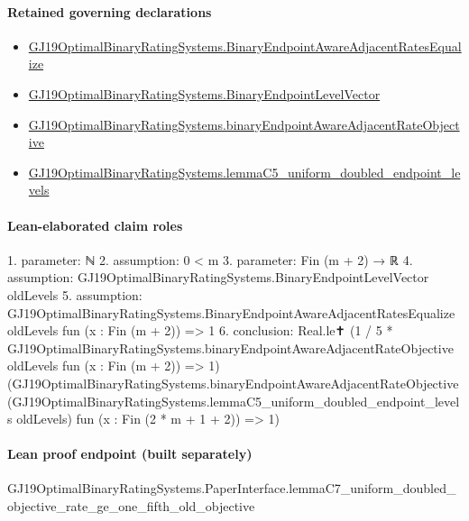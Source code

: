 \documentclass[10pt]{article}
\begin{document}
\paragraph{Retained governing declarations}
\begin{itemize}\raggedright
\item \hyperlink{governing-declaration-5a62c276eedad684}{GJ19\allowbreak{}Optimal\allowbreak{}Binary\allowbreak{}Rating\allowbreak{}Systems.\allowbreak{}Binary\allowbreak{}Endpoint\allowbreak{}Aware\allowbreak{}Adjacent\allowbreak{}Rates\allowbreak{}Equalize}
\item \hyperlink{governing-declaration-aa797f827cdcda67}{GJ19\allowbreak{}Optimal\allowbreak{}Binary\allowbreak{}Rating\allowbreak{}Systems.\allowbreak{}Binary\allowbreak{}Endpoint\allowbreak{}Level\allowbreak{}Vector}
\item \hyperlink{governing-declaration-90a6fa979204b5b7}{GJ19\allowbreak{}Optimal\allowbreak{}Binary\allowbreak{}Rating\allowbreak{}Systems.\allowbreak{}binary\allowbreak{}Endpoint\allowbreak{}Aware\allowbreak{}Adjacent\allowbreak{}Rate\allowbreak{}Objective}
\item \hyperlink{governing-declaration-30a9367e47f16bc8}{GJ19\allowbreak{}Optimal\allowbreak{}Binary\allowbreak{}Rating\allowbreak{}Systems.\allowbreak{}lemma\allowbreak{}C5\_\allowbreak{}uniform\_\allowbreak{}doubled\_\allowbreak{}endpoint\_\allowbreak{}levels}
\end{itemize}
\paragraph{Lean-elaborated claim roles}\begin{ReviewVerbatim}
1. parameter: ℕ
2. assumption: 0 < m
3. parameter: Fin (m + 2) → ℝ
4. assumption: GJ19OptimalBinaryRatingSystems.BinaryEndpointLevelVector oldLevels
5. assumption: GJ19OptimalBinaryRatingSystems.BinaryEndpointAwareAdjacentRatesEqualize oldLevels fun (x : Fin (m + 2)) => 1
6. conclusion: Real.le✝
  (1 / 5 * GJ19OptimalBinaryRatingSystems.binaryEndpointAwareAdjacentRateObjective oldLevels fun (x : Fin (m + 2)) => 1)
  (GJ19OptimalBinaryRatingSystems.binaryEndpointAwareAdjacentRateObjective
    (GJ19OptimalBinaryRatingSystems.lemmaC5_uniform_doubled_endpoint_levels oldLevels) fun (x : Fin (2 * m + 1 + 2)) =>
    1)
\end{ReviewVerbatim}

\paragraph{Lean proof endpoint (built separately)}\begin{ReviewVerbatim}
GJ19OptimalBinaryRatingSystems.PaperInterface.lemmaC7_uniform_doubled_objective_rate_ge_one_fifth_old_objective
\end{ReviewVerbatim}
\end{document}
